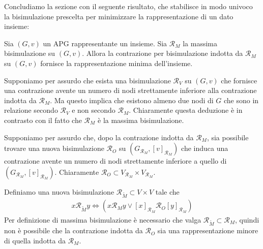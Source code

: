Concludiamo la sezione con il seguente risultato, che stabilisce in modo univoco la bisimulazione prescelta per minimizzare la rappresentazione di un dato insieme:
\begin{theorem}
    Sia $(G,v)$ un APG rappresentante un insieme. Sia $\mathcal{R}_M$ la massima bisimulazione su $(G,v)$. Allora la contrazione per bisimulazione indotta da $\mathcal{R}_M$ su $(G,v)$ fornisce la rappresentazione minima dell'insieme.
\end{theorem}
\begin{proof2}
    Supponiamo per assurdo che esista una bisimulazione $\mathcal{R}_V$ su $(G,v)$ che fornisce una contrazione avente un numero di nodi strettamente inferiore alla contrazione indotta da $\mathcal{R}_M$. Ma questo implica che esistono almeno due nodi di $G$ che sono in relazione secondo $\mathcal{R}_V$ e non secondo $\mathcal{R}_M$. Chiaramente questa deduzione è in contrasto con il fatto che $\mathcal{R}_M$ è la massima bisimulazione.

    Supponiamo per assurdo che, dopo la contrazione indotta da $\mathcal{R}_M$, sia possibile trovare una nuova bisimulazione $\mathcal{R}_O$ su $(G_{\mathcal{R}_M}, [v]_{\mathcal{R}_M})$ che induca una contrazione avente un numero di nodi strettamente inferiore a quello di $(G_{\mathcal{R}_M}, [v]_{\mathcal{R}_M})$. Chiaramente $\mathcal{R}_O \subset V_{\mathcal{R}_M} \times V_{\mathcal{R}_M}$.

    Definiamo una nuova bisimulazione $\mathcal{R}_{\widetilde{M}} \subset V\times V$ tale che
    \begin{gather*}
        x \mathcal{R}_{\widetilde{M}} y \iff (x \mathcal{R}_M y \lor [x]_{\mathcal{R}_M} \mathcal{R}_O [y]_{\mathcal{R}_M})
    \end{gather*}
    Per definizione di massima bisimulazione è necessario che valga $\mathcal{R}_{\widetilde{M}} \subset \mathcal{R}_M$, quindi non è possibile che la contrazione indotta da $\mathcal{R}_O$ sia una rappresentazione minore di quella indotta da $\mathcal{R}_M$.
\end{proof2}

